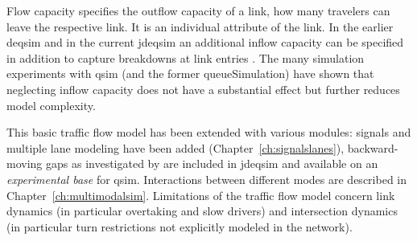 Flow capacity specifies the outflow capacity of a link, \ie how many travelers can leave the respective link. It is an individual attribute of the link. In the earlier \gls{deqsim} and in the current \gls{jdeqsim} an additional inflow capacity can be specified in addition to capture breakdowns at link entries \citep[][p.~99]{Charypar_PhDThesis_2008}. The many simulation experiments with \gls{qsim} (and the former queueSimulation) have shown that neglecting inflow capacity does not have a substantial effect but further reduces model complexity. 

This basic traffic flow model has been extended with various modules: signals and multiple lane modeling have been added (Chapter~\ref{ch:signalslanes}), backward-moving gaps as investigated by \citet[][]{Charypar_PhDThesis_2008} are included in \gls{jdeqsim} and available on an \emph{experimental base} for \gls{qsim}. 
Interactions between different modes are described in Chapter~\ref{ch:multimodalsim}. 
Limitations of the traffic flow model concern link dynamics (in particular overtaking and slow drivers) and intersection dynamics (in particular turn restrictions not explicitly modeled in the network). 


